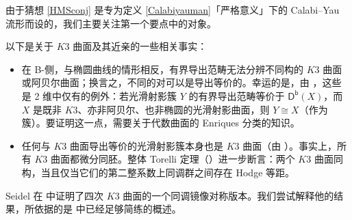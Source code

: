由于猜想 \ref{HMSconj} 是专为定义 \ref{Calabiyauman}「严格意义」下的 Calabi--Yau 流形而设的，我们主要关注第一个要点中的对象。

\begin{Rem}
以下是关于 $K3$ 曲面及其近亲的一些相关事实：
\begin{itemize}[leftmargin=0.5cm]
	\item 在 B-侧，与椭圆曲线的情形相反，有界导出范畴无法分辨不同构的 $K3$ 曲面或阿贝尔曲面；换言之，不同的对可以是导出等价的。幸运的是，由 \cite[命题 12.1]{[Huy06]}，这些是 2 维中仅有的例外：若光滑射影簇 $Y$ 的有界导出范畴等价于 $\mathsf{D^b}(X)$，而 $X$ 是既非 $K3$、亦非阿贝尔、也非椭圆的光滑射影曲面，则 $Y\cong X$（作为簇）。要证明这一点，需要关于代数曲面的 Enriques 分类的知识。
	
	\item 任何与 $K3$ 曲面导出等价的光滑射影簇本身也是 $K3$ 曲面（由 \cite[推论 10.2]{[Huy06]}）。事实上，所有 $K3$ 曲面都微分同胚。整体 Torelli 定理（\cite[定理 10.4]{[Huy06]}）进一步断言：两个 $K3$ 曲面同构，当且仅当它们的第二整系数上同调群之间存在 Hodge 等距。
\end{itemize}
\end{Rem}


Seidel 在 \cite{[Sei13]} 中证明了四次 $K3$ 曲面的一个同调镜像对称版本。我们尝试解释他的结果，所依据的是 \cite[第 8.5 节]{[ABC+09]} 中已经足够简练的概述。 

